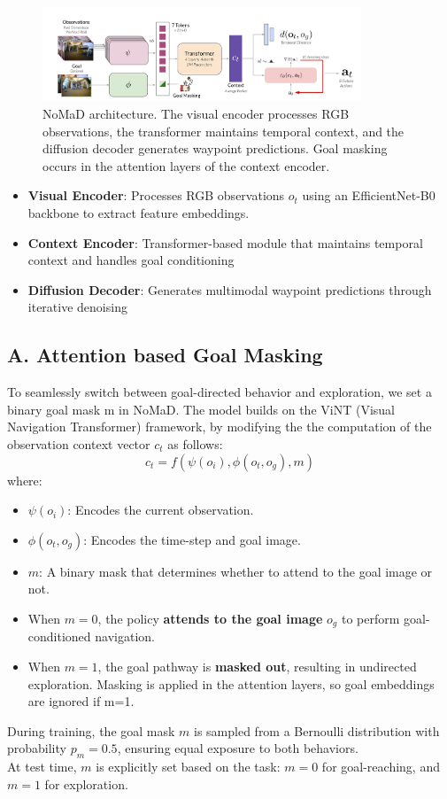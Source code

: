 \documentclass[12pt]{article}
\begin{document}
\begin{figure}[H]
    \centering
    \includegraphics[width=0.85\textwidth]{nomad_diagram.png}
    \caption{NoMaD architecture. The visual encoder processes RGB observations, the transformer maintains temporal context, and the diffusion decoder generates waypoint predictions. Goal masking occurs in the attention layers of the context encoder.}
    \label{fig:nomad_architecture}
\end{figure}

\begin{itemize}
    \item \textbf{Visual Encoder}: Processes RGB observations $o_t$ using an EfficientNet-B0 backbone to extract feature embeddings.
    \item \textbf{Context Encoder}: Transformer-based module that maintains temporal context and handles goal conditioning
    \item \textbf{Diffusion Decoder}: Generates multimodal waypoint predictions through iterative denoising
\end{itemize}

\subsection*{A. Attention based Goal Masking}
\label{subsec:goal_masking}
To seamlessly switch between goal-directed behavior and exploration, we set a binary goal mask m in NoMaD.
The model builds on the ViNT (Visual Navigation Transformer) framework, by modifying the the computation of the observation context vector $c_t$ as follows:\\
\[
c_t = f(\psi(o_i), \phi(o_t, o_g), m)
\]
where:
\begin{itemize}
    \item $\psi(o_i)$: Encodes the current observation.
    \item $\phi(o_t, o_g)$: Encodes the time-step and goal image.
    \item $m$: A binary mask that determines whether to attend to the goal image or not.
\end{itemize}
\begin{itemize}
    \item When $m = 0$, the policy \textbf{attends to the goal image} $o_g$ to perform goal-conditioned navigation.
    \item When $m = 1$, the goal pathway is \textbf{masked out}, resulting in undirected exploration. Masking is applied in the attention layers, so goal embeddings are ignored if m=1.
\end{itemize}
During training, the goal mask $m$ is sampled from a Bernoulli distribution with probability $p_m = 0.5$, ensuring equal exposure to both behaviors. \\
At test time, $m$ is explicitly set based on the task: $m = 0$ for goal-reaching, and $m = 1$ for exploration.
\end{document}
